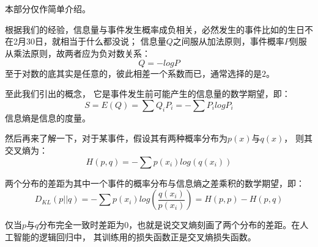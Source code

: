     \section[信息]{}
        本部分仅作简单介绍。
        
        根据我们的经验，信息量与事件发生概率成负相关，必然发生的事件比如\dove 的生日不在2月30日，就相当于什么都没说；
        信息量$Q$之间服从加法原则，事件概率$P$则服从乘法原则，故两者应为负对数关系：
        \begin{equation}
            Q = - logP
            \nonumber
        \end{equation}
        至于对数的底其实是任意的，彼此相差一个系数而已，通常选择的是$2$。

        至此我们引出的概念，
        它是事件发生前可能产生的信息量的数学期望，即：
        \begin{equation}
            S = E(Q) = \sum Q_{i}P_{i} = -\sum P_{i}logP_{i}
            \nonumber
        \end{equation}
        信息熵是信息的度量。

        然后再来了解一下，对于某事件，假设其有两种概率分布为$p(x)$与$q(x)$，
        则其交叉熵为：
        \begin{equation}
            H(p,q) = - \sum p({x_{i}})log(q({x_{i}}))
            \nonumber
        \end{equation}

        两个分布的差距为其中一个事件的概率分布与信息熵之差乘积的数学期望，即：
        \begin{equation}
            D_{KL}(p||q) = - \sum p({x_{i}})log(\frac{q({x_{i}})}{p({x_{i}})}) = H(p,p)-H(p,q)
            \nonumber
        \end{equation} 

        仅当$p$与$q$分布完全一致时差距为0，也就是说交叉熵刻画了两个分布的差距。在人工智能的逻辑回归中，
        其训练用的损失函数正是交叉熵损失函数。
%
